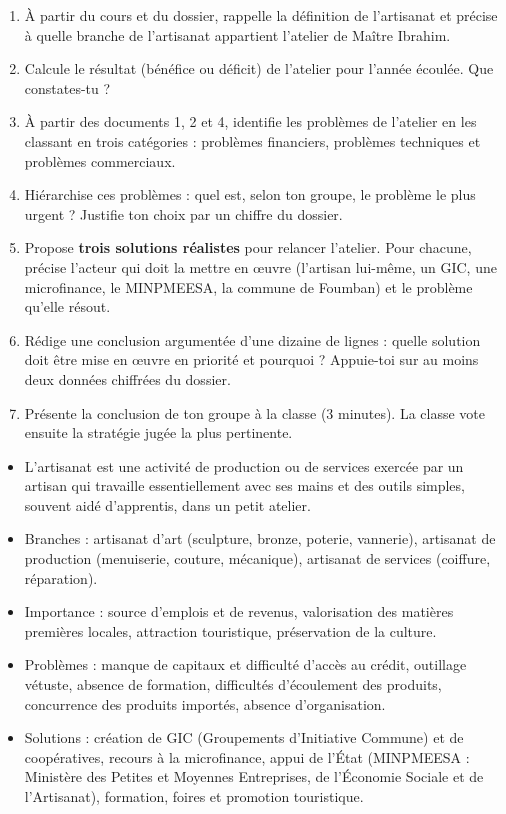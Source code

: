 \documentclass[11pt]{article}
\newcommand{\cle}[1]{{\popxbold\color{popdark}#1}}
\newcounter{popsec}
\newcounter{popsub}
\newcommand{\courssub}[1]{%
  \stepcounter{popsub}%
  \par\vspace{9pt}\noindent{\popxbold\fontsize{11.5}{13}\selectfont\color{popink}{\color{poporange}\thepopsec.\thepopsub}\hspace{6pt}#1}\par\nopagebreak\vspace{4pt}
}
\begin{document}
\begin{enumerate}
\item À partir du cours et du dossier, rappelle la définition de l'artisanat et précise à quelle branche de l'artisanat appartient l'atelier de Maître Ibrahim.
\item Calcule le résultat (bénéfice ou déficit) de l'atelier pour l'année écoulée. Que constates-tu ?
\item À partir des documents 1, 2 et 4, identifie les problèmes de l'atelier en les classant en trois catégories : problèmes financiers, problèmes techniques et problèmes commerciaux.
\item Hiérarchise ces problèmes : quel est, selon ton groupe, le problème le plus urgent ? Justifie ton choix par un chiffre du dossier.
\item Propose \textbf{trois solutions réalistes} pour relancer l'atelier. Pour chacune, précise l'acteur qui doit la mettre en œuvre (l'artisan lui-même, un GIC, une microfinance, le MINPMEESA, la commune de Foumban) et le problème qu'elle résout.
\item Rédige une conclusion argumentée d'une dizaine de lignes : quelle solution doit être mise en œuvre en priorité et pourquoi ? Appuie-toi sur au moins deux données chiffrées du dossier.
\item Présente la conclusion de ton groupe à la classe (3 minutes). La classe vote ensuite la stratégie jugée la plus pertinente.
\end{enumerate}

\courssub{Ressources à mobiliser}

\begin{aretenir}
\begin{itemize}
\item L'\cle{artisanat} est une activité de production ou de services exercée par un artisan qui travaille essentiellement avec ses mains et des outils simples, souvent aidé d'apprentis, dans un petit atelier.
\item Branches : artisanat d'art (sculpture, bronze, poterie, vannerie), artisanat de production (menuiserie, couture, mécanique), artisanat de services (coiffure, réparation).
\item Importance : source d'emplois et de revenus, valorisation des matières premières locales, attraction touristique, préservation de la culture.
\item Problèmes : manque de capitaux et difficulté d'accès au crédit, outillage vétuste, absence de formation, difficultés d'écoulement des produits, concurrence des produits importés, absence d'organisation.
\item Solutions : création de GIC (Groupements d'Initiative Commune) et de coopératives, recours à la microfinance, appui de l'État (MINPMEESA : Ministère des Petites et Moyennes Entreprises, de l'Économie Sociale et de l'Artisanat), formation, foires et promotion touristique.
\end{itemize}
\end{aretenir}
\end{document}
